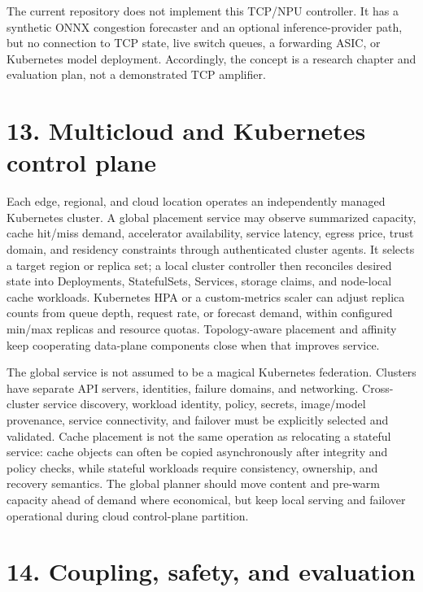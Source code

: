 \documentclass[
  american,
  11pt,
]{article}
\begin{document}
The current repository does not implement this TCP/NPU controller. It
has a synthetic ONNX congestion forecaster and an optional
inference-provider path, but no connection to TCP state, live switch
queues, a forwarding ASIC, or Kubernetes model deployment. Accordingly,
the concept is a research chapter and evaluation plan, not a
demonstrated TCP amplifier.

\section{13. Multicloud and Kubernetes control
plane}\label{multicloud-and-kubernetes-control-plane}

Each edge, regional, and cloud location operates an independently
managed Kubernetes cluster. A global placement service may observe
summarized capacity, cache hit/miss demand, accelerator availability,
service latency, egress price, trust domain, and residency constraints
through authenticated cluster agents. It selects a target region or
replica set; a local cluster controller then reconciles desired state
into Deployments, StatefulSets, Services, storage claims, and node-local
cache workloads. Kubernetes HPA or a custom-metrics scaler can adjust
replica counts from queue depth, request rate, or forecast demand,
within configured min/max replicas and resource quotas. Topology-aware
placement and affinity keep cooperating data-plane components close when
that improves service.

The global service is not assumed to be a magical Kubernetes federation.
Clusters have separate API servers, identities, failure domains, and
networking. Cross-cluster service discovery, workload identity, policy,
secrets, image/model provenance, service connectivity, and failover must
be explicitly selected and validated. Cache placement is not the same
operation as relocating a stateful service: cache objects can often be
copied asynchronously after integrity and policy checks, while stateful
workloads require consistency, ownership, and recovery semantics. The
global planner should move content and pre-warm capacity ahead of demand
where economical, but keep local serving and failover operational during
cloud control-plane partition.

\section{14. Coupling, safety, and
evaluation}\label{coupling-safety-and-evaluation}
\end{document}
